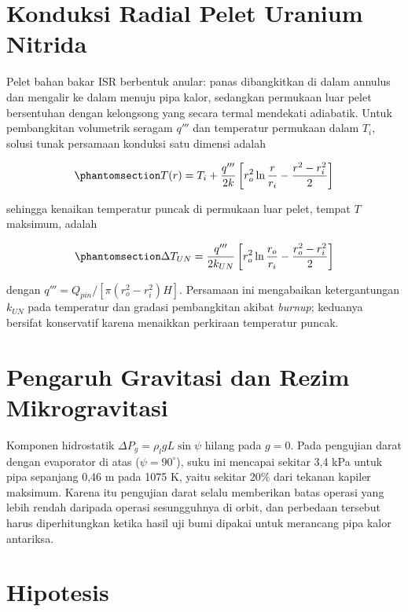 \documentclass[
  indonesian,
  12pt,
  a4paper,
]{report}
\begin{document}
\section{Konduksi Radial Pelet Uranium
Nitrida}\label{konduksi-radial-pelet-uranium-nitrida}

Pelet bahan bakar ISR berbentuk anular: panas dibangkitkan di dalam
annulus dan mengalir ke dalam menuju pipa kalor, sedangkan permukaan
luar pelet bersentuhan dengan kelongsong yang secara termal mendekati
adiabatik. Untuk pembangkitan volumetrik seragam \(q'''\) dan temperatur
permukaan dalam \(T_i\), solusi tunak persamaan konduksi satu dimensi
adalah

\begin{equation}\protect\phantomsection\label{eq-fuel}{T(r) = T_i + \frac{q'''}{2k}\left[r_o^{2}\ln\frac{r}{r_i} - \frac{r^{2} - r_i^{2}}{2}\right]}\end{equation}

sehingga kenaikan temperatur puncak di permukaan luar pelet, tempat
\(T\) maksimum, adalah

\begin{equation}\protect\phantomsection\label{eq-dtfuel}{\Delta T_{UN} = \frac{q'''}{2k_{UN}}\left[r_o^{2}\ln\frac{r_o}{r_i} - \frac{r_o^{2} - r_i^{2}}{2}\right]}\end{equation}

dengan \(q''' = Q_{pin}/[\pi(r_o^{2} - r_i^{2})H]\). Persamaan ini
mengabaikan ketergantungan \(k_{UN}\) pada temperatur dan gradasi
pembangkitan akibat \emph{burnup}; keduanya bersifat konservatif karena
menaikkan perkiraan temperatur puncak.

\section{Pengaruh Gravitasi dan Rezim
Mikrogravitasi}\label{pengaruh-gravitasi-dan-rezim-mikrogravitasi}

Komponen hidrostatik \(\Delta P_g = \rho_l g L \sin\psi\) hilang pada
\(g = 0\). Pada pengujian darat dengan evaporator di atas
(\(\psi = 90^\circ\)), suku ini mencapai sekitar 3,4 kPa untuk pipa
sepanjang 0,46 m pada 1075 K, yaitu sekitar 20\% dari tekanan kapiler
maksimum. Karena itu pengujian darat selalu memberikan batas operasi
yang lebih rendah daripada operasi sesungguhnya di orbit, dan perbedaan
tersebut harus diperhitungkan ketika hasil uji bumi dipakai untuk
merancang pipa kalor antariksa.

\section{Hipotesis}\label{hipotesis}
\end{document}
